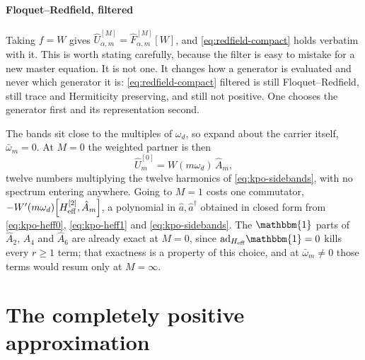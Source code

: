 \documentclass[a4paper,11pt]{article}
\newcommand{\id}{\mathbbm{1}}
\newcommand{\eff}{\mathrm{eff}}
\newcommand{\ad}{\mathrm{ad}}
\begin{document}
\paragraph{Floquet--Redfield, filtered}
Taking $f = W$ gives $\hat U^{[M]}_{\alpha,m} = \hat F^{[M]}_{\alpha,m}[W]$, and \eqref{eq:redfield-compact} holds verbatim with it. This is worth stating carefully, because the filter is easy to mistake for a new master equation. It is not one. It changes how a generator is evaluated and never which generator it is: \eqref{eq:redfield-compact} filtered is still Floquet--Redfield, still trace and Hermiticity preserving, and still not positive. One chooses the generator first and its representation second.

\begin{example}
The bands sit close to the multiples of $\omega_d$, so expand about the carrier itself, $\bar\omega_m = 0$. At $M=0$ the weighted partner is then
\begin{equation}\label{eq:kpo-filtered}
  \hat U^{[0]}_m = W(m\omega_d)\,\hat A_m ,
\end{equation}
twelve numbers multiplying the twelve harmonics of \eqref{eq:kpo-sidebands}, with no spectrum entering anywhere. Going to $M=1$ costs one commutator, $-W'(m\omega_d)\comm{H_\eff^{[2]}}{\hat A_m}$, a polynomial in $\hat a,\hat a^\dagger$ obtained in closed form from \eqref{eq:kpo-heff0}, \eqref{eq:kpo-heff1} and \eqref{eq:kpo-sidebands}. The $\id$ parts of $\hat A_2$, $\hat A_4$ and $\hat A_6$ are already exact at $M=0$, since $\ad_{H_\eff}\id = 0$ kills every $r\ge1$ term; that exactness is a property of this choice, and at $\bar\omega_m\neq0$ those terms would resum only at $M=\infty$.
\end{example}

\section{The completely positive approximation}\label{sec:cp}
\end{document}
